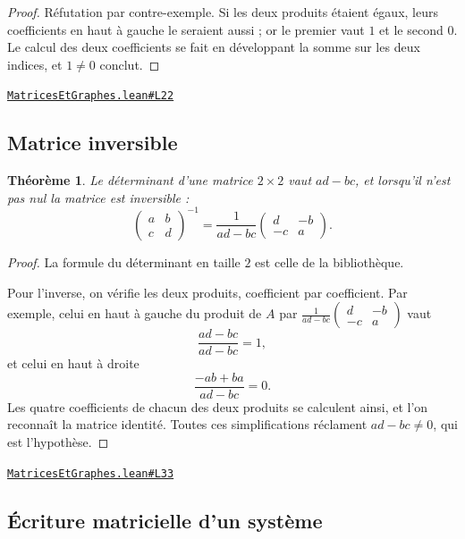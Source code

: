 \documentclass[11pt,a4paper]{article}
\theoremstyle{definition}
\theoremstyle{plain}
\newtheorem{theoreme}{Théorème}
\newcommand{\source}[2]{\par\smallskip\noindent\hfill{\footnotesize\href{#1}{\texttt{#2}}}\par\smallskip}
\begin{document}
\begin{proof}
Réfutation par contre-exemple. Si les deux produits étaient égaux, leurs coefficients en
haut à gauche le seraient aussi ; or le premier vaut $1$ et le second $0$. Le calcul des
deux coefficients se fait en développant la somme sur les deux indices, et
$1 \ne 0$ conclut.
\end{proof}
\source{https://github.com/Commutator-IO/learn-lean/blob/main/cours/02-lycee/10-specialite-mathematiques-terminale-s/MatricesEtGraphes.lean\#L22}{MatricesEtGraphes.lean\#L22}

\subsection{Matrice inversible}

\begin{theoreme}
Le déterminant d'une matrice $2 \times 2$ vaut $ad - bc$, et lorsqu'il n'est pas nul la
matrice est inversible :
\[ \begin{pmatrix} a & b \\ c & d \end{pmatrix}^{-1}
   = \frac{1}{ad - bc}\begin{pmatrix} d & -b \\ -c & a \end{pmatrix} . \]
\end{theoreme}

\begin{proof}
La formule du déterminant en taille $2$ est celle de la bibliothèque.

Pour l'inverse, on vérifie les deux produits, coefficient par coefficient. Par exemple,
celui en haut à gauche du produit de $A$ par
$\frac{1}{ad-bc}\begin{pmatrix} d & -b \\ -c & a\end{pmatrix}$ vaut
\[ \frac{ad - bc}{ad - bc} = 1 , \]
et celui en haut à droite
\[ \frac{-ab + ba}{ad - bc} = 0 . \]
Les quatre coefficients de chacun des deux produits se calculent ainsi, et l'on reconnaît
la matrice identité. Toutes ces simplifications réclament $ad - bc \ne 0$, qui est
l'hypothèse.
\end{proof}
\source{https://github.com/Commutator-IO/learn-lean/blob/main/cours/02-lycee/10-specialite-mathematiques-terminale-s/MatricesEtGraphes.lean\#L33}{MatricesEtGraphes.lean\#L33}

\subsection{Écriture matricielle d'un système}
\end{document}
